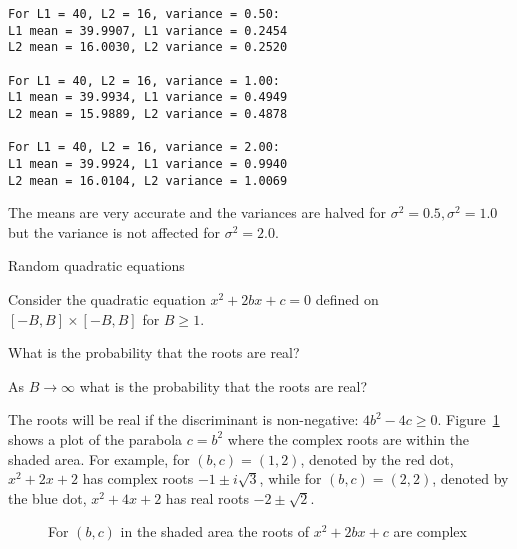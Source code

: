 \begin{verbatim}
For L1 = 40, L2 = 16, variance = 0.50:
L1 mean = 39.9907, L1 variance = 0.2454
L2 mean = 16.0030, L2 variance = 0.2520

For L1 = 40, L2 = 16, variance = 1.00:
L1 mean = 39.9934, L1 variance = 0.4949
L2 mean = 15.9889, L2 variance = 0.4878

For L1 = 40, L2 = 16, variance = 2.00:
L1 mean = 39.9924, L1 variance = 0.9940
L2 mean = 16.0104, L2 variance = 1.0069
\end{verbatim}
The means are very accurate and the variances are halved for $\sigma^2=0.5,\sigma^2=1.0$ but the variance is not affected for $\sigma^2=2.0$.


\begin{prob}{Random quadratic equations}

Consider the quadratic equation $x^2+2bx+c=0$ defined on $[-B,B]\times[-B,B]$ for $B\geq 1$.

 What is the probability that the roots are real?

 As $B\rightarrow \infty$ what is the probability that the roots are real?
\end{prob}

\solution{}

The roots will be real if the discriminant is non-negative: $4b^2-4c\geq 0$. Figure~\ref{f.real-roots} shows a plot of the parabola $c=b^2$ where the complex roots are within the shaded area. For example, for $(b,c)=(1,2)$, denoted by the red dot, $x^2+2x+2$ has complex roots $-1\pm i\sqrt{3}$, while for $(b,c)=(2,2)$, denoted by the blue dot, $x^2+4x+2$ has real roots $-2\pm \sqrt{2}$.
\begin{figure}[tb]
\begin{center}
\end{center}
\caption{For $(b,c)$ in the shaded area the roots of $x^2+2bx+c$ are complex}\label{f.real-roots}
\end{figure}

